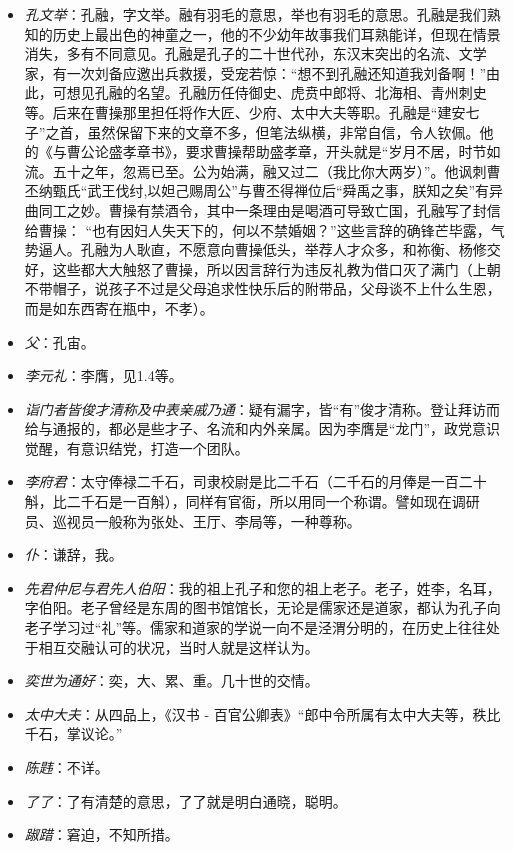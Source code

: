 \documentclass[]{book}
\providecommand{\tightlist}{%
  \setlength{\itemsep}{0pt}\setlength{\parskip}{0pt}}
\begin{document}
\begin{itemize}
\tightlist
\item
  \emph{孔文举}：孔融，字文举。融有羽毛的意思，举也有羽毛的意思。孔融是我们熟知的历史上最出色的神童之一，他的不少幼年故事我们耳熟能详，但现在情景消失，多有不同意见。孔融是孔子的二十世代孙，东汉末突出的名流、文学家，有一次刘备应邀出兵救援，受宠若惊：``想不到孔融还知道我刘备啊！''由此，可想见孔融的名望。孔融历任侍御史、虎贲中郎将、北海相、青州刺史等。后来在曹操那里担任将作大匠、少府、太中大夫等职。孔融是``建安七子''之首，虽然保留下来的文章不多，但笔法纵横，非常自信，令人钦佩。他的《与曹公论盛孝章书》，要求曹操帮助盛孝章，开头就是``岁月不居，时节如流。五十之年，忽焉已至。公为始满，融又过二（我比你大两岁）''。他讽刺曹丕纳甄氏``武王伐纣,以妲己赐周公''与曹丕得禅位后``舜禹之事，朕知之矣''有异曲同工之妙。曹操有禁酒令，其中一条理由是喝酒可导致亡国，孔融写了封信给曹操：
  ``也有因妇人失天下的，何以不禁婚姻？''这些言辞的确锋芒毕露，气势逼人。孔融为人耿直，不愿意向曹操低头，举荐人才众多，和祢衡、杨修交好，这些都大大触怒了曹操，所以因言辞行为违反礼教为借口灭了满门（上朝不带帽子，说孩子不过是父母追求性快乐后的附带品，父母谈不上什么生恩，而是如东西寄在瓶中，不孝）。
\item
  \emph{父}：孔宙。
\item
  \emph{李元礼}：李膺，见1.4等。
\item
  \emph{诣门者皆俊才清称及中表亲戚乃通}：疑有漏字，皆``有''俊才清称。登让拜访而给与通报的，都必是些才子、名流和内外亲属。因为李膺是``龙门''，政党意识觉醒，有意识结党，打造一个团队。
\item
  \emph{李府君}：太守俸禄二千石，司隶校尉是比二千石（二千石的月俸是一百二十斛，比二千石是一百斛），同样有官衙，所以用同一个称谓。譬如现在调研员、巡视员一般称为张处、王厅、李局等，一种尊称。
\item
  \emph{仆}：谦辞，我。
\item
  \emph{先君仲尼与君先人伯阳}：我的祖上孔子和您的祖上老子。老子，姓李，名耳，字伯阳。老子曾经是东周的图书馆馆长，无论是儒家还是道家，都认为孔子向老子学习过``礼''等。儒家和道家的学说一向不是泾渭分明的，在历史上往往处于相互交融认可的状况，当时人就是这样认为。
\item
  \emph{奕世为通好}：奕，大、累、重。几十世的交情。
\item
  \emph{太中大夫}：从四品上，《汉书 -
  百官公卿表》``郎中令所属有太中大夫等，秩比千石，掌议论。''
\item
  \emph{陈韪}：不详。
\item
  \emph{了了}：了有清楚的意思，了了就是明白通晓，聪明。
\item
  \emph{踧踖}：窘迫，不知所措。
\end{itemize}
\end{document}
